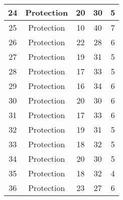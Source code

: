 \documentclass[results.tex]{subfiles}
\begin{document}
\begin{center}
\begin{tabular}{| c || c | c | c | c |}
            \hline
            24                      & Protection                   & 20                     & 30                      & 5                    \\
            \hline
            25                      & Protection                   & 10                     & 40                      & 7                    \\
            \hline
            26                      & Protection                   & 22                     & 28                      & 6                    \\
            \hline
            27                      & Protection                   & 19                     & 31                      & 5                    \\
            \hline
            28                      & Protection                   & 17                     & 33                      & 5                    \\
            \hline
            29                      & Protection                   & 16                     & 34                      & 6                    \\
            \hline
            30                      & Protection                   & 20                     & 30                      & 6                    \\
            \hline
            31                      & Protection                   & 17                     & 33                      & 6                    \\
            \hline
            32                      & Protection                   & 19                     & 31                      & 5                    \\
            \hline
            33                      & Protection                   & 18                     & 32                      & 5                    \\
            \hline
            34                      & Protection                   & 20                     & 30                      & 5                    \\
            \hline
            35                      & Protection                   & 18                     & 32                      & 4                    \\
            \hline
            36                      & Protection                   & 23                     & 27                      & 6                    \\

\end{tabular}
\end{center}
\end{document}

